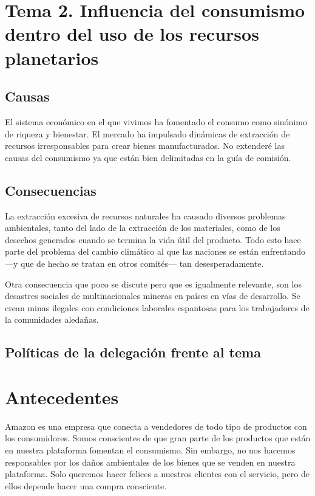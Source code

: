 \documentclass[11pt,a4paper]{article}
\begin{document}
\section{Tema 2. Influencia del consumismo dentro del uso de los recursos planetarios}

\subsection{Causas}

\noindent El sistema económico en el que vivimos ha fomentado el consumo como sinónimo de riqueza y bienestar. El mercado ha impulsado dinámicas de extracción de recursos irresponsables para crear bienes manufacturados. No extenderé las causas del consumismo ya que están bien delimitadas en la guía de comisión. 

\subsection{Consecuencias }

\noindent La extracción excesiva de recursos naturales ha causado diversos problemas ambientales, tanto del lado de la extracción de los materiales, como de los desechos generados cuando se termina la vida útil del producto. Todo esto hace parte del problema del cambio climático al que las naciones se están enfrentando —y que de  hecho se tratan en otros comités— tan desesperadamente.

Otra consecuencia que poco se discute pero que es igualmente relevante, son los desastres sociales de multinacionales mineras en países en vías de desarrollo. Se crean minas ilegales con condiciones laborales espantosas para los trabajadores de la comunidades aledañas.

\subsection{Políticas de la delegación frente al tema}

\section{Antecedentes }

\noindent Amazon es una empresa que conecta a vendedores de todo tipo de productos con los consumidores. Somos conscientes de que gran parte de los productos que están en nuestra plataforma fomentan el consumismo. Sin embargo, no nos hacemos responsables por los daños ambientales de los bienes que se venden en nuestra plataforma. Solo queremos hacer felices a nuestros clientes con el servicio, pero de ellos depende hacer una compra consciente. 
\end{document}
